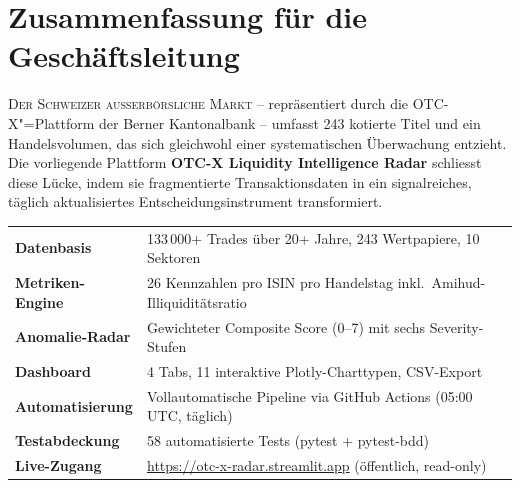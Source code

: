 \documentclass[11pt, a4paper, oneside, openany]{report}
\begin{document}

\chapter*{Zusammenfassung für die Geschäftsleitung}

\lettrine[lines=3, lraise=0.1, findent=3pt, nindent=0pt]{\textcolor{SwissRed}{D}}{er Schweizer ausserbörsliche Markt} -- repräsentiert durch die OTC-X"=Plattform der Berner Kantonalbank -- umfasst 243 kotierte Titel und ein Handelsvolumen, das sich gleichwohl einer systematischen Überwachung entzieht. Die vorliegende Plattform \textbf{OTC-X Liquidity Intelligence Radar} schliesst diese Lücke, indem sie fragmentierte Transaktionsdaten in ein signalreiches, täglich aktualisiertes Entscheidungsinstrument transformiert.

\begin{table}[H]
\centering
\sffamily\small
\begin{tabularx}{\textwidth}{>{\bfseries\sffamily\color{SwissRed}}l X}
  \toprule
  Datenbasis        & 133\,000+ Trades über 20+ Jahre, 243 Wertpapiere, 10 Sektoren \\
  Metriken-Engine   & 26 Kennzahlen pro ISIN pro Handelstag inkl.\ Amihud-Illiquiditätsratio \\
  Anomalie-Radar    & Gewichteter Composite Score (0--7) mit sechs Severity-Stufen \\
  Dashboard         & 4 Tabs, 11 interaktive Plotly-Charttypen, CSV-Export \\
  Automatisierung   & Vollautomatische Pipeline via GitHub Actions (05:00\,UTC, täglich) \\
  Testabdeckung     & 58 automatisierte Tests (pytest + pytest-bdd) \\
  Live-Zugang       & \url{https://otc-x-radar.streamlit.app} (öffentlich, read-only) \\
  \bottomrule
\end{tabularx}
\end{table}
\end{document}
